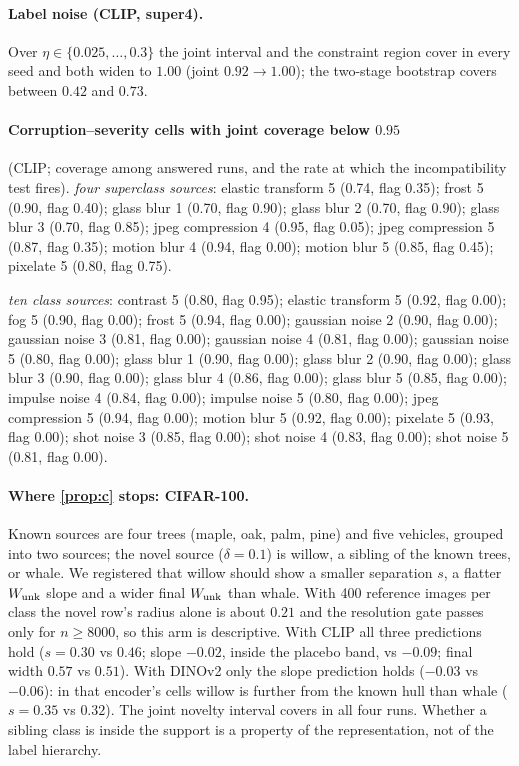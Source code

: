 \paragraph{Label noise (CLIP, super4).} Over $\eta\in\{0.025,\dots,0.3\}$ the joint interval and the
constraint region cover in every seed and both widen to $1.00$ (joint $0.92\to1.00$); the two-stage
bootstrap covers between $0.42$ and $0.73$.

\paragraph{Corruption--severity cells with joint coverage below $0.95$} (CLIP; coverage among answered
runs, and the rate at which the incompatibility test fires). \emph{four superclass sources}: elastic transform 5 (0.74, flag 0.35); frost 5 (0.90, flag 0.40); glass blur 1 (0.70, flag 0.90); glass blur 2 (0.70, flag 0.90); glass blur 3 (0.70, flag 0.85); jpeg compression 4 (0.95, flag 0.05); jpeg compression 5 (0.87, flag 0.35); motion blur 4 (0.94, flag 0.00); motion blur 5 (0.85, flag 0.45); pixelate 5 (0.80, flag 0.75).

\emph{ten class sources}: contrast 5 (0.80, flag 0.95); elastic transform 5 (0.92, flag 0.00); fog 5 (0.90, flag 0.00); frost 5 (0.94, flag 0.00); gaussian noise 2 (0.90, flag 0.00); gaussian noise 3 (0.81, flag 0.00); gaussian noise 4 (0.81, flag 0.00); gaussian noise 5 (0.80, flag 0.00); glass blur 1 (0.90, flag 0.00); glass blur 2 (0.90, flag 0.00); glass blur 3 (0.90, flag 0.00); glass blur 4 (0.86, flag 0.00); glass blur 5 (0.85, flag 0.00); impulse noise 4 (0.84, flag 0.00); impulse noise 5 (0.80, flag 0.00); jpeg compression 5 (0.94, flag 0.00); motion blur 5 (0.92, flag 0.00); pixelate 5 (0.93, flag 0.00); shot noise 3 (0.85, flag 0.00); shot noise 4 (0.83, flag 0.00); shot noise 5 (0.81, flag 0.00).

\paragraph{Where \cref{prop:c} stops: CIFAR-100.} Known sources are four trees (maple, oak, palm, pine)
and five vehicles, grouped into two sources; the novel source ($\delta=0.1$) is willow, a sibling of
the known trees, or whale. We registered that willow should show a smaller separation $s$, a flatter
$W_{\mathrm{unk}}$ slope and a wider final $W_{\mathrm{unk}}$ than whale. With 400 reference images per class the novel
row's radius alone is about $0.21$ and the resolution gate passes only for $n\ge8000$, so this arm is
descriptive. With CLIP all three predictions hold ($s=0.30$ vs $0.46$; slope $-0.02$, inside the
placebo band, vs $-0.09$; final width $0.57$ vs $0.51$). With DINOv2 only the slope prediction holds
($-0.03$ vs $-0.06$): in that encoder's cells willow is further from the known hull than whale
($s=0.35$ vs $0.32$). The joint novelty interval covers in all four runs. Whether a sibling class is
inside the support is a property of the representation, not of the label hierarchy.

